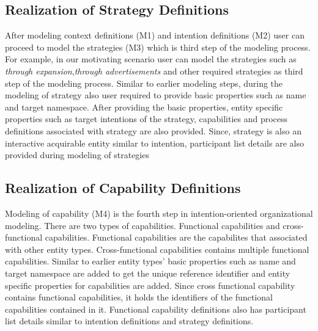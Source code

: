 \subsection{Realization of Strategy Definitions}
After modeling context definitions (M1) and intention definitions (M2) user can proceed to model the strategies (M3) which is third step of the modeling process. For example, in our motivating scenario user can model the strategies such as \textit{through expansion},\textit{through advertisements} and other required strategies as third step of the modeling process. Similar to earlier modeling steps, during the modeling of strategy also user required to provide basic properties such as name and target namespace. After providing the basic properties, entity specific properties such as target intentions of the strategy, capabilities and process definitions associated with strategy are also provided. Since, strategy is also an interactive acquirable entity similar to intention, participant list details are also provided during modeling of strategies

\subsection{Realization of Capability Definitions}
Modeling of capability (M4) is the fourth step in intention-oriented organizational modeling. There are two types of capabilities. Functional capabilities and cross-functional capabilities. Functional capabilities are the capabilites that associated with other entity types. Cross-functional capabilities contains multiple functional capabilities. Similar to earlier entity types' basic properties such as name and target namespace are added to get the unique reference identifier and entity specific properties for capabilities are added. Since cross functional capability contains functional capabilities, it holds the identifiers of the functional capabilities contained in it. Functional capability definitions also has participant list details similar to intention definitions and strategy definitions. 

